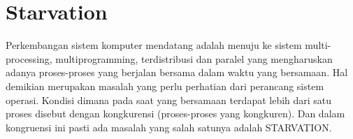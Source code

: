 \section{Starvation}
Perkembangan sistem komputer mendatang adalah menuju ke sistem multi-processing, multiprogramming, terdistribusi dan paralel yang mengharuskan adanya proses-proses yang berjalan bersama dalam waktu yang bersamaan. Hal demikian merupakan masalah yang perlu perhatian dari perancang sistem operasi. Kondisi dimana pada saat yang bersamaan terdapat lebih dari satu proses disebut dengan kongkurensi (proses-proses yang kongkuren). Dan dalam kongruensi ini pasti ada masalah yang salah satunya adalah STARVATION.